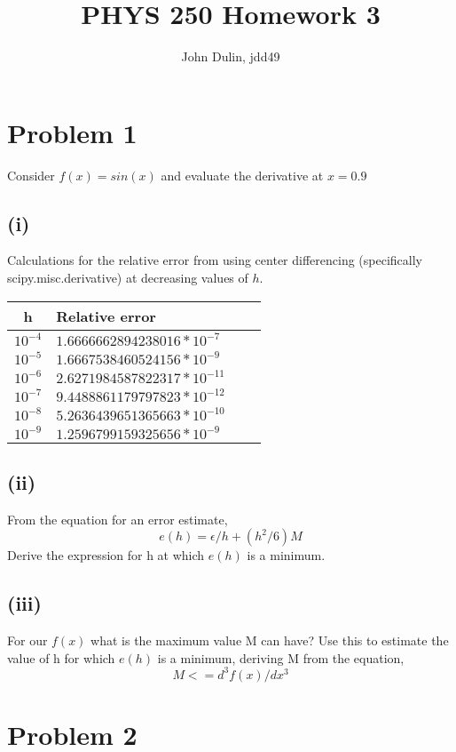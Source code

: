 \documentclass{article}
\author{John Dulin, jdd49}
\title{PHYS 250 Homework 3}
\begin{document}
\maketitle

\section*{Problem 1}
Consider $ f(x) = sin(x) $ and evaluate the derivative at $x = 0.9$

\subsection*{(i)}
Calculations for the relative error from using center differencing (specifically scipy.misc.derivative) at decreasing
values of $h$.

\begin{tabular}{cl | cl}
h & Relative error\\
\hline
$10^{-4}$ & $1.6666662894238016 * 10^{-7}$\\
$10^{-5}$ & $1.6667538460524156 * 10^{-9}$\\
$10^{-6}$ & $2.6271984587822317 * 10^{-11}$\\
$10^{-7}$ & $9.4488861179797823 * 10^{-12}$\\
$10^{-8}$ & $5.2636439651365663  * 10^{-10}$\\
$10^{-9}$ & $1.2596799159325656 * 10^{-9}$\\
\end{tabular}

\subsection*{(ii)}
From the equation for an error estimate,
$$ e(h) = \epsilon/h + (h^2/6)M $$
Derive the expression for h at which $e(h)$ is a minimum.

\vspace{60 mm}

\subsection*{(iii)}
For our $f(x)$ what is the maximum value M can have?  Use this to estimate the value of h for which $e(h)$ is a minimum, deriving M from the equation,
$$ M <= d^3f(x)/dx^3 $$

\vspace{60 mm}

\section*{Problem 2}
\end{document}

